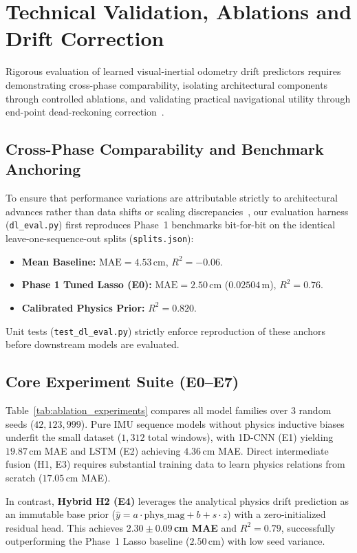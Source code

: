 \section{Technical Validation, Ablations and Drift Correction}
\label{sec:validation}

Rigorous evaluation of learned visual-inertial odometry drift predictors requires demonstrating cross-phase comparability, isolating architectural components through controlled ablations, and validating practical navigational utility through end-point dead-reckoning correction~\cite{r5sturm2012,r5zhang2018}.

\subsection{Cross-Phase Comparability and Benchmark Anchoring}
To ensure that performance variations are attributable strictly to architectural advances rather than data shifts or scaling discrepancies~\cite{r5melis2018}, our evaluation harness (\texttt{dl\_eval.py}) first reproduces Phase~1 benchmarks bit-for-bit on the identical leave-one-sequence-out splits (\texttt{splits.json}):
\begin{itemize}
    \item \textbf{Mean Baseline:} $\mathrm{MAE} = 4.53$\,cm, $R^2 = -0.06$.
    \item \textbf{Phase 1 Tuned Lasso (E0):} $\mathrm{MAE} = 2.50$\,cm ($0.02504$\,m), $R^2 = 0.76$.
    \item \textbf{Calibrated Physics Prior:} $R^2 = 0.820$.
\end{itemize}
Unit tests (\texttt{test\_dl\_eval.py}) strictly enforce reproduction of these anchors before downstream models are evaluated.

\subsection{Core Experiment Suite (E0--E7)}
Table~\ref{tab:ablation_experiments} compares all model families over 3 random seeds ($42, 123, 999$). Pure IMU sequence models without physics inductive biases underfit the small dataset ($1{,}312$ total windows), with 1D-CNN (E1) yielding $19.87$\,cm MAE and LSTM (E2) achieving $4.36$\,cm MAE. Direct intermediate fusion (H1, E3) requires substantial training data to learn physics relations from scratch ($17.05$\,cm MAE).

In contrast, \textbf{Hybrid H2 (E4)} leverages the analytical physics drift prediction as an immutable base prior ($\hat{y} = a \cdot \mathrm{phys\_mag} + b + s \cdot z$) with a zero-initialized residual head. This achieves \textbf{$2.30 \pm 0.09$\,cm MAE} and \textbf{$R^2 = 0.79$}, successfully outperforming the Phase~1 Lasso baseline ($2.50$\,cm) with low seed variance.

